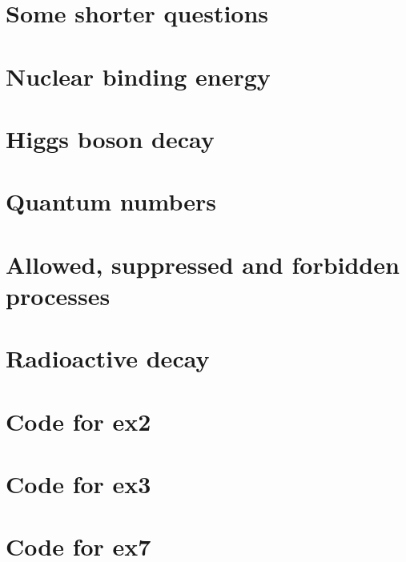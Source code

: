 \documentclass[]{article}
\begin{document}
\section{Some shorter questions}


\section{Nuclear binding energy}


\section{Higgs boson decay}


\section{}

\section{Quantum numbers}


\section{Allowed, suppressed and forbidden processes}


\section{Radioactive decay}


\section{Code for ex2}


\section{Code for ex3}


\section{Code for ex7}

\end{document}
